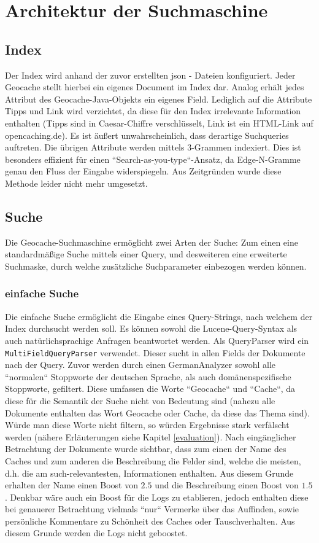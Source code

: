 \documentclass[11pt,a4paper]{scrreprt}
\renewcommand\emph[1]{\colorbox{light-gray}{\texttt{#1}}}
\begin{document}
\section{Architektur der Suchmaschine}

\subsection{Index}
Der Index wird anhand der zuvor erstellten json - Dateien konfiguriert. Jeder Geocache stellt hierbei ein eigenes Document im Index dar. Analog erhält jedes Attribut des Geocache-Java-Objekts ein eigenes Field. Lediglich auf die Attribute Tipps und Link wird verzichtet, da diese für den Index irrelevante Information enthalten (Tipps sind in Caesar-Chiffre verschlüsselt, Link ist ein HTML-Link auf opencaching.de). Es ist äußert unwahrscheinlich, dass derartige Suchqueries auftreten. Die übrigen Attribute werden mittels 3-Grammen indexiert. Dies ist besonders effizient für einen ``Search-as-you-type``-Ansatz, da Edge-N-Gramme genau den Fluss der Eingabe widerspiegeln. Aus Zeitgründen wurde diese Methode leider nicht mehr umgesetzt.

\subsection{Suche}
 Die Geocache-Suchmaschine ermöglicht zwei Arten der Suche: Zum einen eine standardmäßige Suche mittels einer Query, und desweiteren eine erweiterte Suchmaske, durch welche zusätzliche Suchparameter einbezogen werden können.

\subsubsection{einfache Suche}
Die einfache Suche ermöglicht die Eingabe eines Query-Strings, nach welchem der Index durchsucht werden soll. Es können sowohl die Lucene-Query-Syntax als auch natürlichsprachige Anfragen beantwortet werden. Als QueryParser wird ein \emph{MultiFieldQueryParser} verwendet. Dieser sucht in allen Fields der Dokumente nach der Query. Zuvor werden durch einen GermanAnalyzer sowohl alle ``normalen`` Stoppworte der deutschen Sprache, als auch domänenspezifische Stoppworte, gefiltert. Diese umfassen die Worte ``Geocache`` und ``Cache``, da diese für die Semantik der Suche nicht von Bedeutung sind (nahezu alle Dokumente enthalten das Wort Geocache oder Cache, da diese das Thema sind). Würde man diese Worte nicht filtern, so würden Ergebnisse stark verfälscht werden (nähere Erläuterungen siehe Kapitel \ref{evaluation}). Nach eingänglicher Betrachtung der Dokumente wurde sichtbar, dass zum einen der Name des Caches und zum anderen die Beschreibung die Felder sind, welche die meisten, d.h. die am such-relevantesten, Informationen enthalten. Aus diesem Grunde erhalten der Name einen Boost von $2.5$ und die Beschreibung einen Boost von $1.5$. Denkbar wäre auch ein Boost für die Logs zu etablieren, jedoch enthalten diese bei genauerer Betrachtung vielmals ``nur`` Vermerke über das Auffinden, sowie persönliche Kommentare zu Schönheit des Caches oder Tauschverhalten. Aus diesem Grunde werden die Logs nicht geboostet.
\end{document}
